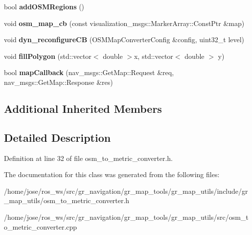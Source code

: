 \begin{DoxyCompactItemize}
bool {\bfseries add\+O\+S\+M\+Regions} ()
\item 
\mbox{\label{classgr__map__utils_1_1Osm2MetricMap_aab4ab1aae454c9ac5b16c831d0027a47}} 
void {\bfseries osm\+\_\+map\+\_\+cb} (const visualization\+\_\+msgs\+::\+Marker\+Array\+::\+Const\+Ptr \&map)
\item 
\mbox{\label{classgr__map__utils_1_1Osm2MetricMap_aea6fd2fc9227cf972d675c20e8564a53}} 
void {\bfseries dyn\+\_\+reconfigure\+CB} (O\+S\+M\+Map\+Converter\+Config \&config, uint32\+\_\+t level)
\item 
\mbox{\label{classgr__map__utils_1_1Osm2MetricMap_a0d2437bf5b13131e3bf943a9e582ffbb}} 
void {\bfseries fill\+Polygon} (std\+::vector$<$ double $>$x, std\+::vector$<$ double $>$ y)
\item 
\mbox{\label{classgr__map__utils_1_1Osm2MetricMap_ad37912f4dcd36142fadfae69ed9fc178}} 
bool {\bfseries map\+Callback} (nav\+\_\+msgs\+::\+Get\+Map\+::\+Request \&req, nav\+\_\+msgs\+::\+Get\+Map\+::\+Response \&res)
\end{DoxyCompactItemize}
\subsection*{Additional Inherited Members}


\subsection{Detailed Description}


Definition at line 32 of file osm\+\_\+to\+\_\+metric\+\_\+converter.\+h.



The documentation for this class was generated from the following files\+:\begin{DoxyCompactItemize}
\item 
/home/jose/ros\+\_\+ws/src/gr\+\_\+navigation/gr\+\_\+map\+\_\+tools/gr\+\_\+map\+\_\+utils/include/gr\+\_\+map\+\_\+utils/osm\+\_\+to\+\_\+metric\+\_\+converter.\+h\item 
/home/jose/ros\+\_\+ws/src/gr\+\_\+navigation/gr\+\_\+map\+\_\+tools/gr\+\_\+map\+\_\+utils/src/osm\+\_\+to\+\_\+metric\+\_\+converter.\+cpp\end{DoxyCompactItemize}
